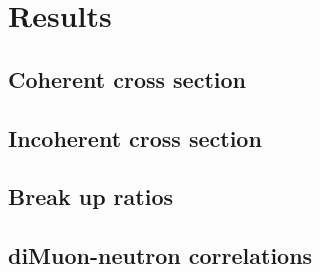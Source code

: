\chapter{Results}	
  \section{Coherent cross section}
  \section{Incoherent cross section}
  \section{Break up ratios}
  \section{diMuon-neutron correlations}
